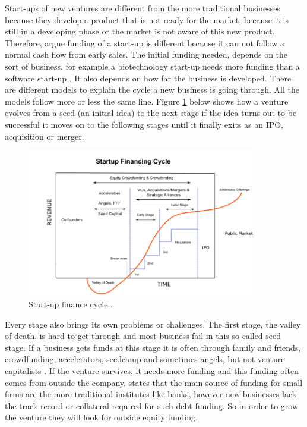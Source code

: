 \documentclass[a4paper, 11pt]{article}
\begin{document}
Start-ups of new ventures are different from the more traditional businesses because they develop a product that is not ready for the market, because it is still in a developing phase or the market is not aware of this new product. Therefore, \cite{TiddBessant} argue funding of a start-up is different because it can not follow a normal cash flow from early sales. The initial funding needed, depends on the sort of business, for example a biotechnology start-up needs more funding than a software start-up \citep{TiddBessant}. It also depends on how far the business is developed. There are different models to explain the cycle a new business is going through. All the models follow more or less the same line. Figure \ref{fig:graph1} below shows how a venture evolves from a seed (an initial idea) to the next stage if the idea turns out to be successful it moves on to the following stages until it finally exits as an IPO, acquisition or merger.

\begin{figure}[h!]
    \centering
    \includegraphics[width=0.9\textwidth]{FinCycle.png}
    \caption{Start-up finance cycle \citep{wiki}.}
    \label{fig:graph1}
\end{figure}

Every stage also brings its own problems or challenges. The first stage, the valley of death, is hard to get through and most business fail in this so called seed stage. If a business gets funds at this stage it is often through family and friends, crowdfunding, accelerators, seedcamp and sometimes angels, but not venture capitalists \citep{TiddBessant}. If the venture survives, it needs more funding and this funding often comes from outside the company. \cite{casson2008oxford} states that the main source of funding for small firms are the more traditional institutes like banks, however new businesses lack the track record or collateral required for such debt funding. So in order to grow the venture they will look for outside equity funding.
\end{document}
